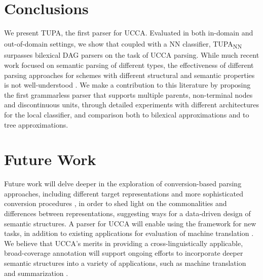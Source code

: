 \documentclass[a0,portrait]{a0poster}
\newcommand{\parser}[1]{TUPA\textsubscript{#1}}
\begin{document}
\begin{multicols}{2}
\color{SaddleBrown} %

\section*{Conclusions}

We present \parser{}, the first parser for UCCA.
Evaluated in both in-domain and out-of-domain settings, we show that coupled with a
NN classifier, \parser{NN} surpasses bilexical DAG parsers on the task of UCCA parsing.
While much recent work focused on semantic parsing of different types,
the effectiveness of different parsing approaches for schemes with
different structural and semantic properties is not well-understood 
\cite{kuhlmann2016towards}.
We make a contribution to this literature by proposing the first grammarless parser that supports multiple parents, non-terminal nodes and discontinuous units, through detailed experiments with different architectures for the local classifier, and comparison both to bilexical approximations and to tree approximations.




\color{DarkSlateGray} %

\section*{Future Work}

Future work will delve deeper in the exploration of
conversion-based parsing approaches, including different target
representations and more sophisticated conversion procedures \cite{kong-15},
in order to shed light on the commonalities and differences between
representations, suggesting ways for a data-driven design of semantic structures.
A parser for UCCA will enable using the framework for new tasks,
in addition to existing applications for evaluation of
machine translation \cite{birch2016hume}.
We believe that UCCA's merits in providing a cross-linguistically applicable,
broad-coverage annotation will support ongoing efforts to incorporate deeper
semantic structures into a variety of applications,
such as machine translation \cite{jones2012semantics}
and summarization \cite{liu2015toward}.








\end{multicols}
\end{document}
